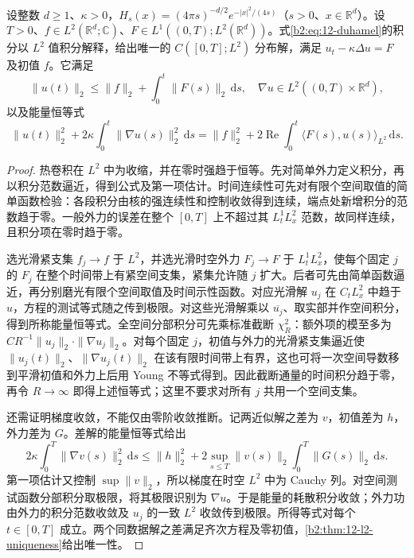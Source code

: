 \begin{proposition}[粗外力与热能量]\label{b2:prop:12-forced-energy}
设整数 \(d\geq1\)、\(\kappa>0\)，\(H_s(x)=(4\pi s)^{-d/2}e^{-|x|^2/(4s)}\)（\(s>0\)、\(x\in\mathbb R^d\)）。设 \(T>0\)、\(f\in L^2(\mathbb R^d;\mathbb C)\)、\(F\in L^1((0,T);L^2(\mathbb R^d))\)。式\eqref{b2:eq:12-duhamel}的积分以 \(L^2\) 值积分解释，给出唯一的 \(C([0,T];L^2)\) 分布解，满足 \(u_t-\kappa\Delta u=F\) 及初值 \(f\)。它满足
\[
 \|u(t)\|_2\leq\|f\|_2+\int_0^t\|F(s)\|_2\,\mathrm{d}s,
 \quad \nabla u\in L^2((0,T)\times\mathbb R^d),
\]
以及能量恒等式
\[
 \|u(t)\|_2^2+2\kappa\int_0^t\|\nabla u(s)\|_2^2\,\mathrm{d}s
 =\|f\|_2^2+2\operatorname{Re}\int_0^t\langle F(s),u(s)\rangle_{L^2}\,\mathrm{d}s.
\]
\end{proposition}
\begin{proof}
热卷积在 \(L^2\) 中为收缩，并在零时强趋于恒等。先对简单外力定义积分，再以积分范数逼近，得到公式及第一项估计。时间连续性可先对有限个空间取值的简单函数检验：各段积分由核的强连续性和控制收敛得到连续，端点处新增积分的范数趋于零。一般外力的误差在整个 \([0,T]\) 上不超过其 \(L^1_tL^2_x\) 范数，故同样连续，且积分项在零时趋于零。

选光滑紧支集 \(f_j\to f\) 于 \(L^2\)，并选光滑时空外力 \(F_j\to F\) 于 \(L^1_tL^2_x\)，使每个固定 \(j\) 的 \(F_j\) 在整个时间带上有紧空间支集，紧集允许随 \(j\) 扩大。后者可先由简单函数逼近，再分别磨光有限个空间取值及时间示性函数。对应光滑解 \(u_j\) 在 \(C_tL^2_x\) 中趋于 \(u\)，方程的测试等式随之传到极限。对这些光滑解乘以 \(\overline{u_j}\)、取实部并作空间积分，得到所称能量恒等式。全空间分部积分可先乘标准截断 \(\chi_R^2\)：额外项的模至多为 \(CR^{-1}\|u_j\|_2\cdot\|\nabla u_j\|_2\)。对每个固定 \(j\)，初值与外力的光滑紧支集逼近使 \(\|u_j(t)\|_2\)、\(\|\nabla u_j(t)\|_2\) 在该有限时间带上有界，这也可将一次空间导数移到平滑初值和外力上后用 Young 不等式得到。因此截断通量的时间积分趋于零，再令 \(R\to\infty\) 即得上述恒等式；这里不要求对所有 \(j\) 共用一个空间支集。

还需证明梯度收敛，不能仅由零阶收敛推断。记两近似解之差为 \(v\)，初值差为 \(h\)，外力差为 \(G\)。差解的能量恒等式给出
\[
 2\kappa\int_0^T\|\nabla v(s)\|_2^2\,\mathrm{d}s
 \leq\|h\|_2^2+2\sup_{s\leq T}\|v(s)\|_2
                    \int_0^T\|G(s)\|_2\,\mathrm{d}s.
\]
第一项估计又控制 \(\sup\|v\|_2\)，所以梯度在时空 \(L^2\) 中为 Cauchy 列。对空间测试函数分部积分取极限，将其极限识别为 \(\nabla u\)。于是能量的耗散积分收敛；外力功由外力的积分范数收敛及 \(u_j\) 的一致 \(L^2\) 收敛传到极限。所得等式对每个 \(t\in[0,T]\) 成立。两个同数据解之差满足齐次方程及零初值，\cref{b2:thm:12-l2-uniqueness}给出唯一性。
\end{proof}

